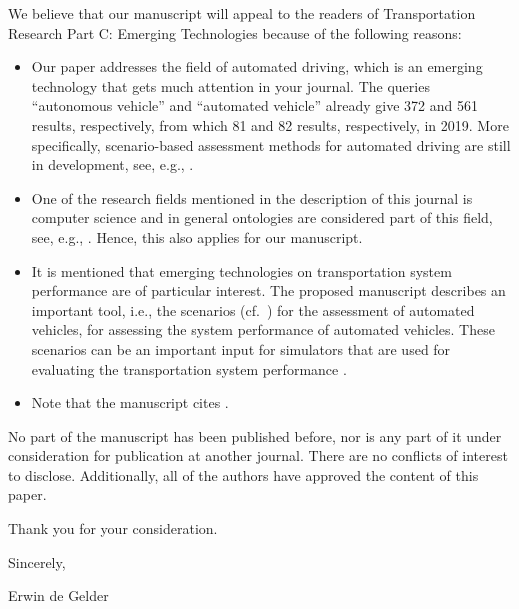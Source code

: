 \documentclass{article}
\renewcommand{\cite}[1]{\parencite{#1}}
\begin{document}
We believe that our manuscript will appeal to the readers of Transportation Research Part C: Emerging Technologies because of the following reasons:
\begin{itemize}
	\item Our paper addresses the field of automated driving, which is an emerging technology that gets much attention in your journal. The queries ``autonomous vehicle'' and ``automated vehicle'' already give 372 and 561 results, respectively, from which 81 and 82 results, respectively, in 2019. More specifically, scenario-based assessment methods for automated driving are still in development, see, e.g., \textcite{hou2019framework, shao2019evaluating, ge2018experimental, cui2018development, sepulcre2013cooperative}.
	\item One of the research fields mentioned in the description of this journal is computer science and in general ontologies are considered part of this field, see, e.g., \textcite{katsumi2018ontologies, benvenuti2017ontologybased, choi2015ontological, maiti2017conceptualization, ali2017fuzzy}. Hence, this also applies for our manuscript.
	\item It is mentioned that emerging technologies on transportation system performance are of particular interest. The proposed manuscript describes an important tool, i.e., the scenarios (cf.\ \textcite{xiong2015orchestration, bhatti2015design}) for the assessment of automated vehicles, for assessing the system performance of automated vehicles. These scenarios can be an important input for simulators that are used for evaluating the transportation system performance \cite{hou2019framework, cui2018development, ma2017twodimensional, mcconky2019dontpass}.
	\item Note that the manuscript cites \textcite{maiti2017conceptualization, katsumi2018ontologies, benvenuti2017ontologybased, xiong2015orchestration, hou2019framework, shao2019evaluating}.
\end{itemize}

No part of the manuscript has been published before, nor is any part of it under consideration for publication at another journal. There are no conflicts of interest to disclose. Additionally, all of the authors have approved the content of this paper.

\vspace{1em}

Thank you for your consideration.

\vspace{1em}

Sincerely,

Erwin de Gelder

\printbibliography
\end{document}
